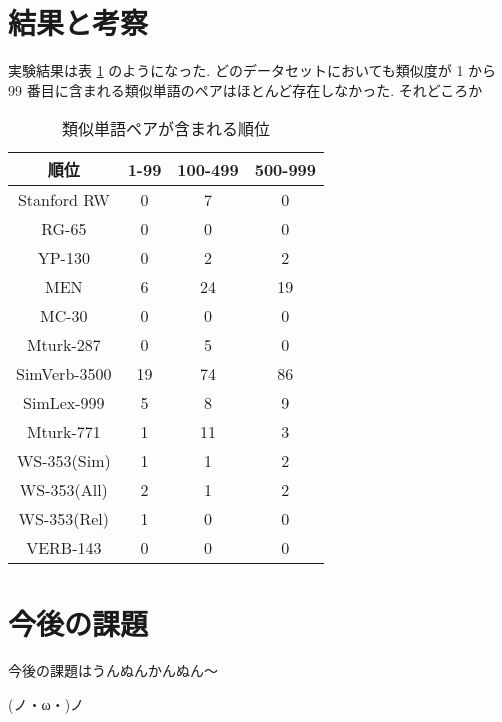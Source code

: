 \documentclass[twocolumn]{jarticle}     %
\begin{document}
\section{結果と考察}
実験結果は表 \ref{tb:result} のようになった. 
どのデータセットにおいても類似度が 1 から 99 番目に含まれる類似単語のペアはほとんど存在しなかった. 
それどころか

\begin{table}[th]
  \centering
  \caption{類似単語ペアが含まれる順位}
  \label{tb:result}
  \begin{tabular}{c|ccc}
    \hline
    順位           & 1-99 & 100-499 & 500-999 \\ \hline
    Stanford RW  & 0    & 7       & 0       \\
    RG-65        & 0    & 0       & 0       \\
    YP-130       & 0    & 2       & 2       \\
    MEN          & 6    & 24      & 19      \\
    MC-30        & 0    & 0       & 0       \\
    Mturk-287    & 0    & 5       & 0       \\
    SimVerb-3500 & 19   & 74      & 86      \\
    SimLex-999   & 5    & 8       & 9       \\
    Mturk-771    & 1    & 11      & 3       \\
    WS-353(Sim)  & 1    & 1       & 2       \\
    WS-353(All)  & 2    & 1       & 2       \\
    WS-353(Rel)  & 1    & 0       & 0       \\
    VERB-143     & 0    & 0       & 0       \\ \hline
  \end{tabular}
\end{table}

\section{今後の課題}
今後の課題はうんぬんかんぬん〜

(ノ・ω・)ノ  

\end{document}
